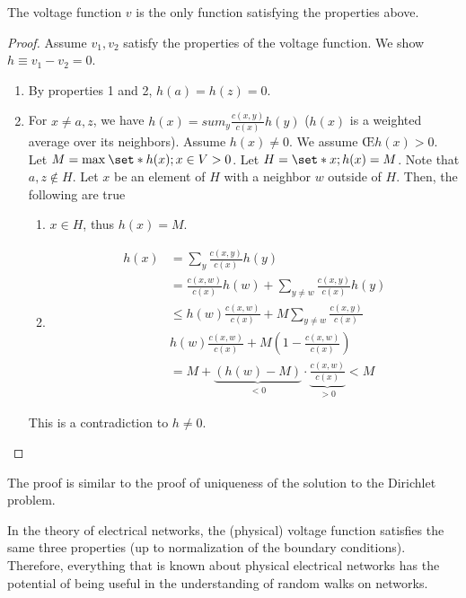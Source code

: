 \begin{lem}
    The voltage function $v$ is the only function satisfying the properties above.
\end{lem}
\begin{proof}
    Assume $v_1,v_2$ satisfy the properties of the voltage function. We show $h \equiv v_1-v_2=0$. 
    \begin{enumerate}
      \item By properties 1 and 2, $h(a)=h(z)=0$. 
      \item For $x\neq a,z$, we have \(h(x) = sum_y \frac{c(x,y)}{c(x)} h(y)\) ($h(x)$ is a weighted average over its neighbors). Assume $h(x) \neq 0$. We assume \OE $h(x) >0$. Let \(M=\max_{}\set*{h(x); x\in V}>0\). Let \(H= \set*{x; h(x)=M}\). Note that $a,z \notin H$. Let $x$ be an element of $H$ with a neighbor $w$ outside of  $H$. Then, the following are true
        \begin{enumerate}
            \item $x\in H$, thus $h(x)=M$.
            \item 
              \begin{align*}
                h(x)  &=\sum_y \frac{c(x,y)}{c(x)} h(y) \\
                     &=\frac{c(x,w)}{c(x)}h(w) + \sum_{y\neq w} \frac{c(x,y)}{c(x)}h(y) \\
                     &\leq h(w) \frac{c(x,w)}{c(x)} + M \sum_{y\neq w} \frac{c(x,y)}{c(x)} \\
                     & h(w) \frac{c(x,w)}{c(x)} + M \left(1-\frac{c(x,w)}{c(x)}\right) \\
                     &=M + \underbrace{ \left(h(w)-M\right)}_{<0}\cdot \underbrace{\frac{c(x,w)}{c(x)}}_{>0} < M
              \end{align*}
              
        \end{enumerate}
        This is a contradiction to $h \neq 0$.
    \end{enumerate}
\end{proof}

\begin{remark}
    The proof is similar to the proof of uniqueness of the solution to the Dirichlet problem.
\end{remark}

\begin{remark}
    In the theory of electrical networks, the (physical) voltage function satisfies the same three properties (up to normalization of the boundary conditions). Therefore, everything that is known about physical electrical networks has the potential of being useful in the understanding of random walks on networks.
\end{remark}




